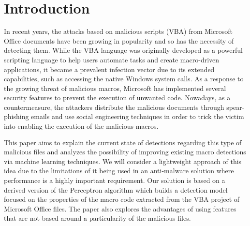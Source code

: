 \section{Introduction}
In recent years, the attacks based on malicious scripts (VBA) from Microsoft Office documents have been growing in popularity and so has the necessity of detecting them. While the VBA language was originally developed as a powerful scripting language to help users automate tasks and create macro-driven applications, it became a prevalent infection vector due to its extended capabilities, such as accessing the native Windows system calls. As a response to the growing threat of malicious macros, Microsoft has implemented several security features to prevent the execution of unwanted code. Nowadays, as a countermeasure, the attackers distribute the malicious documents through spear-phishing emails and use social engineering techniques in order to trick the victim into enabling the execution of the malicious macros.
\par
This paper aims to explain the current state of detections regarding this type of malicious files and analyzes the possibility of improving existing macro detections via machine learning techniques. We will consider a lightweight approach of this idea due to the limitations of it being used in an anti-malware solution where performance is a highly important requirement. Our solution is based on a derived version of the Perceptron algorithm which builds a detection model focused on the properties of the macro code extracted from the VBA project of Microsoft Office files. The paper also explores the advantages of using features that are not based around a particularity of the malicious files.
